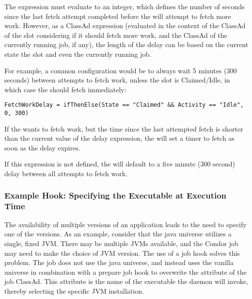 The  expression must evaluate to an integer,
which defines the number of seconds since the last fetch attempt
completed before the  will attempt to fetch more work.
However, as a ClassAd expression (evaluated in the context of the
ClassAd of the slot considering if it should fetch more work, and the
ClassAd of the currently running job, if any), the length of the delay
can be based on the current state the slot and even the currently
running job.

For example, a common configuration would be to always wait 5
minutes (300 seconds) between attempts to fetch work, unless the slot
is Claimed/Idle, in which case the  should fetch
immediately:

\footnotesize
\begin{verbatim}
FetchWorkDelay = ifThenElse(State == "Claimed" && Activity == "Idle", 0, 300) 
\end{verbatim}
\normalsize

If the  wants to fetch work, but the time since the
last attempted fetch is shorter than the current value of the delay
expression, the  will set a timer to fetch as soon as
the delay expires.

If this expression is not defined, the  will default to
a five minute (300 second) delay between all attempts to fetch work.

\subsubsection{\label{sec:job-hooks-example}
Example Hook: Specifying the Executable at Execution Time}

The availability of multiple versions of an application leads to
the need to specify one of the versions. 
As an example, consider that 
the java universe utilizes a single, fixed JVM.
There may be multiple JVMs available, and the Condor job may
need to make the choice of JVM version.
The use of a job hook solves this problem.
The job does not use the java universe, and instead uses the
vanilla universe in combination with a 
prepare job hook to overwrite the  attribute of the job ClassAd.
This attribute is the name of the
executable the  daemon will invoke,
thereby selecting the specific JVM installation.

